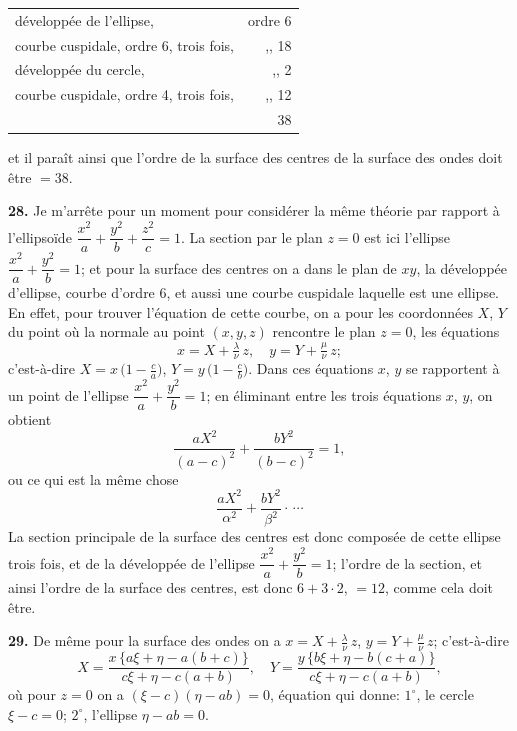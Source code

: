 \documentclass[11pt,a4paper]{article}
\begin{document}
\begin{center}
\begin{tabular}{lr}
d\'evelopp\'ee de l'ellipse, & ordre 6 \\
courbe cuspidale, ordre 6, trois fois, & ,, 18 \\
d\'evelopp\'ee du cercle, & ,, 2 \\
courbe cuspidale, ordre 4, trois fois, & ,, 12 \\
\hline
& 38
\end{tabular}
\end{center}

et il para\^it ainsi que l'ordre de la surface des centres de la surface des ondes doit \^etre $= 38$.

\textbf{28.} Je m'arr\^ete pour un moment pour consid\'erer la m\^eme th\'eorie par rapport \`a l'ellipso\"ide $\dfrac{x^2}{a} + \dfrac{y^2}{b} + \dfrac{z^2}{c} = 1$. La section par le plan $z = 0$ est ici l'ellipse $\dfrac{x^2}{a} + \dfrac{y^2}{b} = 1$; et pour la surface des centres on a dans le plan de $xy$, la d\'evelopp\'ee d'ellipse, courbe d'ordre 6, et aussi une courbe cuspidale laquelle est une ellipse. En effet, pour trouver l'\'equation de cette courbe, on a pour les coordonn\'ees $X$, $Y$ du point o\`u la normale au point $(x, y, z)$ rencontre le plan $z = 0$, les \'equations
\[
x = X + \tfrac{\lambda}{\nu}\,z,\quad y = Y + \tfrac{\mu}{\nu}\,z;
\]
c'est-\`a-dire $X = x\,\bigl(1 - \tfrac{c}{a}\bigr)$, $Y = y\,\bigl(1 - \tfrac{c}{b}\bigr)$. Dans ces \'equations $x$, $y$ se rapportent \`a un point de l'ellipse $\dfrac{x^2}{a} + \dfrac{y^2}{b} = 1$; en \'eliminant entre les trois \'equations $x$, $y$, on obtient
\[
\frac{a X^2}{(a - c)^2} + \frac{b Y^2}{(b - c)^2} = 1,
\]
ou ce qui est la m\^eme chose
\[
\frac{a X^2}{\alpha^2} + \frac{b Y^2}{\beta^2}\cdot\,\cdots
\]
La section principale de la surface des centres est donc compos\'ee de cette ellipse trois fois, et de la d\'evelopp\'ee de l'ellipse $\dfrac{x^2}{a} + \dfrac{y^2}{b} = 1$; l'ordre de la section, et ainsi l'ordre de la surface des centres, est donc $6 + 3\cdot 2$, $= 12$, comme cela doit \^etre.

\textbf{29.} De m\^eme pour la surface des ondes on a $x = X + \tfrac{\lambda}{\nu}\,z$, $y = Y + \tfrac{\mu}{\nu}\,z$; c'est-\`a-dire
\[
X = \frac{x\,\{a\xi + \eta - a(b + c)\}}{c\xi + \eta - c(a + b)},\quad Y = \frac{y\,\{b\xi + \eta - b(c + a)\}}{c\xi + \eta - c(a + b)},
\]
o\`u pour $z = 0$ on a $(\xi - c)(\eta - ab) = 0$, \'equation qui donne: $1^\circ$, le cercle $\xi - c = 0$; $2^\circ$, l'ellipse $\eta - ab = 0$.
\end{document}
